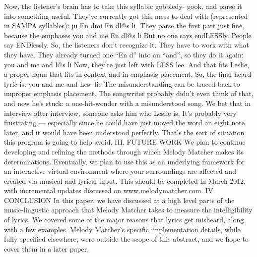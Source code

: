 \documentclass[10pt,oneside]{memoir}
\def\mybibliostyle{plain}
\def\bibliocommand{}
\begin{document}
Now, the listener's brain has to take this syllabic gobbledy- gook, and parse it into something useful. They've currently got this mess to deal with (represented in SAMPA syllables):
ju En dmi En dl@s li
 They parse the first part just fine, because the emphases
you and me En dl@s li
But no one says endLESSly. People say ENDlessly. So, the listeners don't recognize it. They have to work with what they have. They already turned one ``En d'' into an ``and'', so they do it again:
you and me and l@s li
Now, they're just left with LESS lee. And that fits Leslie, a proper noun that fits in context and in emphasis placement. So, the final heard lyric is:
you and me and Les- lie
The misunderstanding can be traced back to improper emphasis placement. The songwriter probably didn't even think of that, and now he's stuck: a one-hit-wonder with a misunderstood song. We bet that in interview after interview, someone asks him who Leslie is. It's probably very frustrating --- especially since he could have just moved the word an eight note later, and it would have been understood perfectly.
That's the sort of situation this program is going to help avoid.
III. FUTURE WORK
We plan to continue developing and refining the methods through which Melody Matcher makes its determinations. Eventually, we plan to use this as an underlying framework for an interactive virtual environment where your surroundings are affected and created via musical and lyrical input. This should be completed in March 2012, with incremental updates discussed on www.melodymatcher.com.
IV. CONCLUSION
In this paper, we have discussed at a high level parts of the music-lingustic approach that Melody Matcher takes to measure the intelligibility of lyrics. We covered some of the major reasons that lyrics get misheard, along with a few examples. Melody Matcher's specific implementation details, while fully specified elsewhere, were outside the scope of this abstract, and we hope to cover them in a later paper.


%
%

\backmatter


\bibliocommand

\printglossary


\printindex
\end{document}
